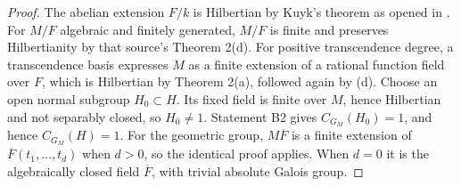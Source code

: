 \begin{proof}
The abelian extension $F/k$ is Hilbertian by Kuyk's theorem as opened in
\cite[\S4, Theorem 2(g)(2)]{B_Geyer2012}. For $M/F$ algebraic and finitely
generated, $M/F$ is finite and preserves Hilbertianity by that source's
Theorem 2(d). For positive transcendence degree, a transcendence basis
expresses $M$ as a finite extension of a rational function field over
$F$, which is Hilbertian by Theorem 2(a), followed again by (d).
Choose an open normal subgroup $H_0\subset H$. Its fixed field is finite
over $M$, hence Hilbertian and not separably closed, so $H_0\ne1$.
Statement B2 gives $C_{G_M}(H_0)=1$, and hence $C_{G_M}(H)=1$.
For the geometric group, $M\overline F$ is a finite extension of
$\overline F(t_1,\ldots,t_d)$ when $d>0$, so the identical proof applies.
When $d=0$ it is the algebraically closed field $\overline F$, with trivial
absolute Galois group.
\end{proof}
